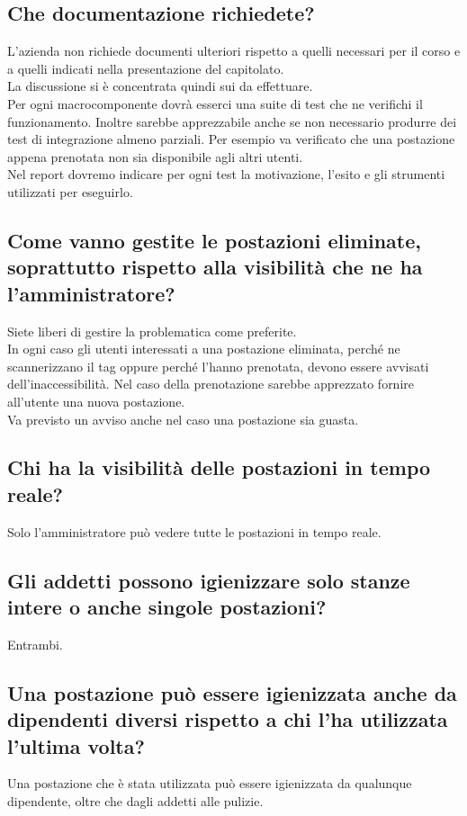 \subsection*{Che documentazione richiedete?}
L'azienda non richiede documenti ulteriori rispetto a quelli necessari per il corso e a quelli indicati nella presentazione del capitolato.\\
La discussione si è concentrata quindi sui  da effettuare.\\
Per ogni macrocomponente dovrà esserci una suite di test che ne verifichi il funzionamento. Inoltre sarebbe apprezzabile anche se non necessario produrre dei test di integrazione almeno parziali. Per esempio va verificato che una postazione appena prenotata non sia disponibile agli altri utenti.\\
Nel report dovremo indicare per ogni test la motivazione, l'esito e gli strumenti utilizzati per eseguirlo.

\subsection*{Come vanno gestite le postazioni eliminate, soprattutto rispetto alla visibilità che ne ha l'amministratore?}
Siete liberi di gestire la problematica come preferite.\\
In ogni caso gli utenti interessati a una postazione eliminata, perché ne scannerizzano il tag  oppure perché l'hanno prenotata, devono essere avvisati dell'inaccessibilità. Nel caso della prenotazione sarebbe apprezzato fornire all'utente una nuova postazione.\\
Va previsto un avviso anche nel caso una postazione sia guasta.

\subsection*{Chi ha la visibilità delle postazioni in tempo reale?}
Solo l'amministratore può vedere tutte le postazioni in tempo reale.

\subsection*{Gli addetti possono igienizzare solo stanze intere o anche singole postazioni?}
Entrambi.

\subsection*{Una postazione può essere igienizzata anche da dipendenti diversi rispetto a chi l'ha utilizzata l'ultima volta?}
Una postazione che è stata utilizzata può essere igienizzata da qualunque dipendente, oltre che dagli addetti alle pulizie.

